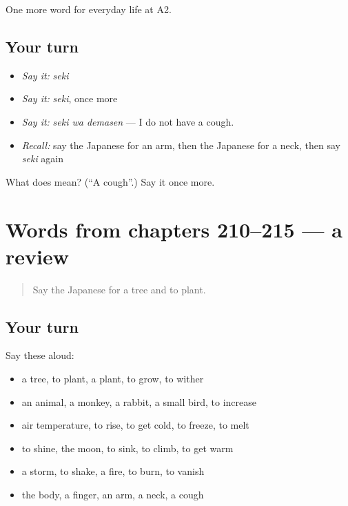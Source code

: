 \begin{grammarlens}[title={What you've built}]
One more word for everyday life at A2.
\end{grammarlens}

\subsection*{Your turn}
\begin{itemize}
\raggedright
  \item \emph{Say it:} \emph{seki}
  \item \emph{Say it:} \emph{seki}, once more
  \item \emph{Say it:} \emph{seki wa demasen} — I do not have a cough.
  \item \emph{Recall:} say the Japanese for an arm, then the Japanese for a neck, then say \emph{seki} again
\end{itemize}

\begin{tcolorbox}[breakable,colback=teal!4,colframe=teal!35!black,title={Before you move on}]
What does  mean? (\textquotedblleft{}A cough\textquotedblright{}.) Say it once more.
\end{tcolorbox}
\section[(dialogue)]{Words from chapters 210–215 — a review}

\label{lesson:JA-R215-review-210-215}



\begin{quote}
Say the Japanese for a tree and to plant.
\end{quote}

\subsection*{Your turn}
Say these aloud:

\begin{itemize}
\raggedright
  \item a tree, to plant, a plant, to grow, to wither
  \item an animal, a monkey, a rabbit, a small bird, to increase
  \item air temperature, to rise, to get cold, to freeze, to melt
  \item to shine, the moon, to sink, to climb, to get warm
  \item a storm, to shake, a fire, to burn, to vanish
  \item the body, a finger, an arm, a neck, a cough
\end{itemize}

